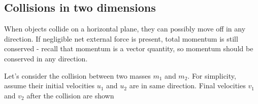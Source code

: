 \subsection{Collisions in two dimensions}

When objects collide on a horizontal plane, they can possibly move off in any direction. If negligible net external force is present, total momentum is still conserved - recall that momentum is a vector quantity, so momentum should be conserved in any direction.

\vspace*{\baselineskip}

Let's consider the collision between two masses $m_1$ and $m_2$. For simplicity, assume their initial velocities $u_1$ and $u_2$ are in same direction. Final velocities $v_1$ and $v_2$ after the collision are shown

